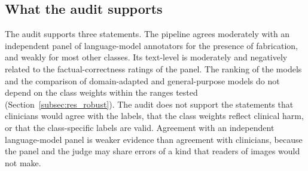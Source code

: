 \subsection{What the audit supports}\label{sec:val_summary}
The audit supports three statements. The pipeline agrees moderately with an independent panel of language-model annotators for the presence of fabrication, and weakly for most other classes. Its text-level \SMHR{} is moderately and negatively related to the factual-correctness ratings of the panel. The ranking of the models and the comparison of domain-adapted and general-purpose models do not depend on the class weights within the ranges tested (Section~\ref{subsec:res_robust}). The audit does not support the statements that clinicians would agree with the labels, that the class weights reflect clinical harm, or that the class-specific labels are valid. Agreement with an independent language-model panel is weaker evidence than agreement with clinicians, because the panel and the judge may share errors of a kind that readers of images would not make.
